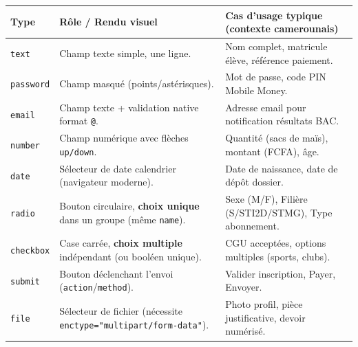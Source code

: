 \documentclass[11pt]{article}
\begin{document}
\begin{propriete}
\begin{center}
\begin{tabularx}{\linewidth}{|l|X|X|}
\hline
\textbf{Type} & \textbf{Rôle / Rendu visuel} & \textbf{Cas d'usage typique (contexte camerounais)} \\
\hline
\texttt{text} & Champ texte simple, une ligne. & Nom complet, matricule élève, référence paiement. \\
\hline
\texttt{password} & Champ masqué (points/astérisques). & Mot de passe, code PIN Mobile Money. \\
\hline
\texttt{email} & Champ texte + validation native format \texttt{@}. & Adresse email pour notification résultats BAC. \\
\hline
\texttt{number} & Champ numérique avec flèches \texttt{up/down}. & Quantité (sacs de maïs), montant (FCFA), âge. \\
\hline
\texttt{date} & Sélecteur de date calendrier (navigateur moderne). & Date de naissance, date de dépôt dossier. \\
\hline
\texttt{radio} & Bouton circulaire, \textbf{choix unique} dans un groupe (même \texttt{name}). & Sexe (M/F), Filière (S/STI2D/STMG), Type abonnement. \\
\hline
\texttt{checkbox} & Case carrée, \textbf{choix multiple} indépendant (ou booléen unique). & CGU acceptées, options multiples (sports, clubs). \\
\hline
\texttt{submit} & Bouton déclenchant l'envoi (\texttt{action}/\texttt{method}). & Valider inscription, Payer, Envoyer. \\
\hline
\texttt{file} & Sélecteur de fichier (nécessite \texttt{enctype="multipart/form-data"}). & Photo profil, pièce justificative, devoir numérisé. \\
\hline
\end{tabularx}
\end{center}
\end{propriete}
\end{document}
